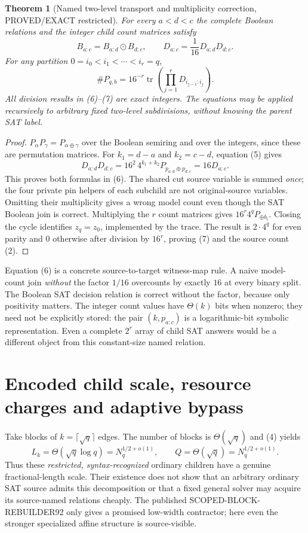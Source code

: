 \documentclass[11pt]{article}
\newtheorem{theorem}{Theorem}
\begin{document}
\begin{theorem}[Named two-level transport and multiplicity correction,
PROVED/EXACT restricted]
For every $a<d<c$ the complete Boolean relations and the \emph{integer}
child count matrices satisfy
\[
 \boxed{B_{a:c}=B_{a:d}\odot B_{d:c}},\qquad
 \boxed{D_{a:c}=\frac1{16}D_{a:d}D_{d:c}}.             \tag{6}
\]
For any partition $0=i_0<i_1<\cdots<i_r=q$,
\[
 \boxed{\#P_{q,b}
 =16^{-r}\operatorname{tr}
   \left(\prod_{j=1}^{r}D_{i_{j-1}:i_j}\right)}.         \tag{7}
\]
All division results in (6)--(7) are exact integers.
The equations may be applied recursively to arbitrary fixed
two-level subdivisions, without knowing the parent SAT label.
\end{theorem}
\begin{proof}
$P_{\alpha}P_{\gamma}=P_{\alpha\oplus\gamma}$ over the
Boolean semiring and over the integers, since these are permutation
matrices. For $k_1=d-a$ and $k_2=c-d$, equation (5) gives
\[
 D_{a:d}D_{d:c}
 =16^2\,4^{k_1+k_2}P_{p_{a:d}\oplus p_{d:c}}
 =16D_{a:c}.
\]
This proves both formulas in (6). The shared cut source variable is
summed \emph{once}; the four private pin helpers of each subchild
are not original-source variables. Omitting their multiplicity gives
a wrong model count even though the SAT Boolean join is correct.
Multiplying the $r$ count matrices gives
$16^r4^qP_{\oplus b_i}$. Closing the cycle identifies $z_q=z_0$,
implemented by the trace. The result is
$2\cdot4^q$ for even parity and $0$ otherwise after division by
$16^r$, proving (7) and the source count (2).
\end{proof}

Equation (6) is a concrete source-to-target witness-map rule.
A naive model-count join \emph{without} the factor $1/16$
overcounts by exactly $16$ at every binary split. The Boolean SAT
decision relation is correct without the factor, because only
positivity matters. The integer count values have
$\Theta(k)$ bits when nonzero; they need not be explicitly stored:
the pair $(k,p_{a:c})$ is a logarithmic-bit symbolic representation.
Even a complete $2^r$ array of child SAT answers would be a
different object from this constant-size named relation.

\section{Encoded child scale, resource charges and adaptive bypass}
Take blocks of $k=\lceil\sqrt q\rceil$ edges. The number of blocks is
$\Theta(\sqrt q)$ and (4) yields
\[
 L_k=\Theta(\sqrt q\log q)
       =N_q^{1/2+o(1)},\qquad
 Q=\Theta(\sqrt q)=N_q^{1/2+o(1)}.                    \tag{8}
\]
Thus these \emph{restricted, syntax-recognized} ordinary children have
a genuine fractional-length scale. Their existence does not show
that an arbitrary ordinary SAT source admits this decomposition or
that a fixed general solver may acquire its source-named relations
cheaply. The published SCOPED-BLOCK-REBUILDER92 only gives a promised
low-width contractor; here even the stronger specialized affine
structure is source-visible.
\end{document}
